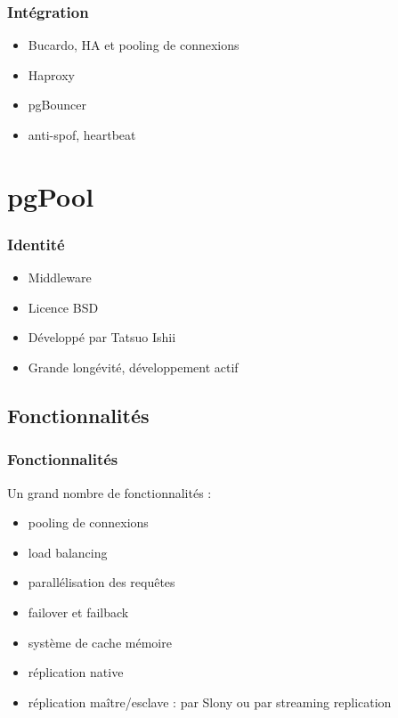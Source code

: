 \documentclass[utf8]{beamer}
\begin{document}
\subtitle{Intégration}

\begin{frame}
  \frametitle{Intégration} 
  \begin{itemize}
  \item Bucardo, HA et pooling de connexions
  \item Haproxy
  \item pgBouncer
  \item anti-spof, heartbeat
  \end{itemize}
\end{frame}


\section{pgPool}

\subtitle{Identité}

\begin{frame}
  \frametitle{Identité} 
  \begin{itemize}
  \item Middleware
  \item Licence BSD
  \item Développé par Tatsuo Ishii
  \item Grande longévité, développement actif
  \end{itemize}
\end{frame}

\subsection{Fonctionnalités}

\begin{frame}
  \frametitle{Fonctionnalités}
  
  Un grand nombre de fonctionnalités : 

  \begin{itemize}
  \item pooling de connexions
  \item load balancing
  \item parallélisation des requêtes
  \item failover et failback
  \end{itemize}
\end{frame}
  
\begin{frame}
  \begin{itemize}
  \item système de cache mémoire
  \item réplication native
  \item réplication maître/esclave : par Slony ou par streaming replication
  \end{itemize}
\end{frame}
\end{document}
